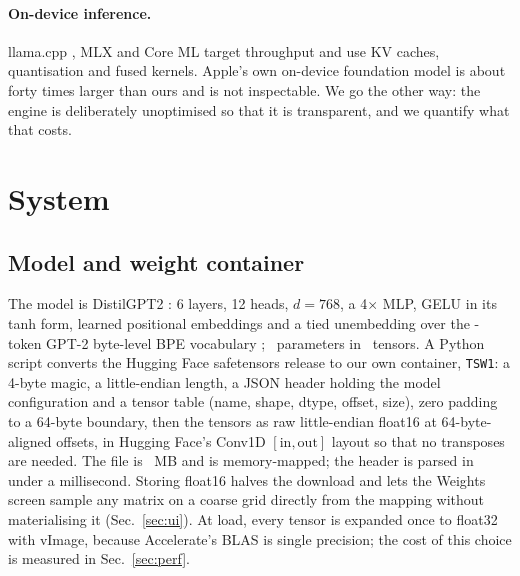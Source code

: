 \documentclass[11pt]{article}
\begin{document}
\paragraph{On-device inference.} llama.cpp \citep{gerganov2023}, MLX \citep{hannun2023} and Core ML target throughput and use KV caches, quantisation and fused kernels. Apple's own on-device foundation model \citep{apple2024} is about forty times larger than ours and is not inspectable. We go the other way: the engine is deliberately unoptimised so that it is transparent, and we quantify what that costs.

\section{System}\label{sec:system}
\subsection{Model and weight container}
The model is DistilGPT2 \citep{sanh2019}: 6 layers, 12 heads, $d=768$, a 4$\times$ MLP, GELU \citep{hendrycks2016} in its tanh form, learned positional embeddings and a tied unembedding over the \VocabSize-token GPT-2 byte-level BPE vocabulary \citep{sennrich2016,radford2019}; \NumParamsExact\ parameters in \NumTensors\ tensors. A Python script converts the Hugging Face safetensors release to our own container, \texttt{TSW1}: a 4-byte magic, a little-endian length, a JSON header holding the model configuration and a tensor table (name, shape, dtype, offset, size), zero padding to a 64-byte boundary, then the tensors as raw little-endian float16 at 64-byte-aligned offsets, in Hugging Face's Conv1D $[\mathrm{in},\mathrm{out}]$ layout so that no transposes are needed. The file is \WeightFileMB~MB and is memory-mapped; the header is parsed in under a millisecond. Storing float16 halves the download and lets the Weights screen sample any matrix on a coarse grid directly from the mapping without materialising it (Sec.~\ref{sec:ui}). At load, every tensor is expanded once to float32 with vImage, because Accelerate's BLAS is single precision; the cost of this choice is measured in Sec.~\ref{sec:perf}.
\end{document}
